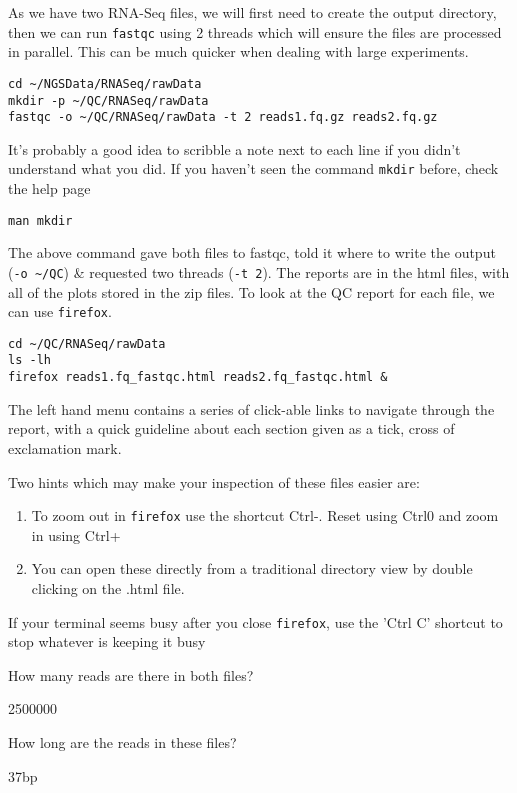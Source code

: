 \begin{steps}
As we have two RNA-Seq files, we will first need to create the output directory, then we can run \texttt{fastqc} using 2 threads which will ensure the files are processed in parallel.
This can be much quicker when dealing with large experiments.
\begin{lstlisting}
cd ~/NGSData/RNASeq/rawData
mkdir -p ~/QC/RNASeq/rawData
fastqc -o ~/QC/RNASeq/rawData -t 2 reads1.fq.gz reads2.fq.gz
\end{lstlisting}
It's probably a good idea to scribble a note next to each line if you didn't understand what you did.
If you haven't seen the command \texttt{mkdir} before, check the help page 
\begin{lstlisting}
man mkdir
\end{lstlisting}
\end{steps}

\begin{steps}
The above command gave both files to fastqc, told it where to write the output (\texttt{-o \~{}/QC}) \& requested two threads (\texttt{-t 2}). 
The reports are in the html files, with all of the plots stored in the zip files. 
To look at the QC report for each file, we can use \texttt{firefox}.
\begin{lstlisting}
cd ~/QC/RNASeq/rawData
ls -lh
firefox reads1.fq_fastqc.html reads2.fq_fastqc.html &
\end{lstlisting}
The left hand menu contains a series of click-able links to navigate through the report, with a quick guideline about each section given as a tick, cross of exclamation mark.
\end{steps}

\begin{note}
Two hints which may make your inspection of these files easier are:
\begin{enumerate}
	\item To zoom out in \texttt{firefox} use the shortcut Ctrl-. Reset using Ctrl0 and zoom in using Ctrl+
	\item You can open these directly from a traditional directory view by double clicking on the .html file.
\end{enumerate}
If your terminal seems busy after you close \texttt{firefox}, use the 'Ctrl C' shortcut to stop whatever is keeping it busy
\end{note}

\begin{questions}
How many reads are there in both files?\\
\begin{answer}
  2500000 \\
\end{answer}
How long are the reads in these files?\\
\begin{answer}
  37bp \\
\end{answer}
\end{questions}

